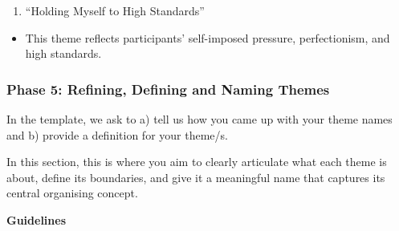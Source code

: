 \documentclass[
  english,
  letterpaper,
  DIV=11,
  numbers=noendperiod]{scrreprt}
\providecommand{\tightlist}{%
  \setlength{\itemsep}{0pt}\setlength{\parskip}{0pt}}
\begin{document}
\begin{tcolorbox}
\begin{enumerate}
\def\labelenumi{\arabic{enumi}.}
\setcounter{enumi}{1}
\tightlist
\item
  ``Holding Myself to High Standards''
\end{enumerate}

\begin{itemize}
\tightlist
\item
  This theme reflects participants' self-imposed pressure,
  perfectionism, and high standards.
\end{itemize}

\end{tcolorbox}

\subsubsection{Phase 5: Refining, Defining and Naming
Themes}\label{phase-5-refining-defining-and-naming-themes}

\begin{tcolorbox}[enhanced jigsaw, breakable, bottomtitle=1mm, leftrule=.75mm, opacityback=0, colbacktitle=quarto-callout-important-color!10!white, opacitybacktitle=0.6, toprule=.15mm, colback=white, left=2mm, coltitle=black, bottomrule=.15mm, titlerule=0mm, title=\textcolor{quarto-callout-important-color}{\faExclamation}\hspace{0.5em}{Phase 5: What is asked for?}, toptitle=1mm, colframe=quarto-callout-important-color-frame, arc=.35mm, rightrule=.15mm]

In the template, we ask to a) tell us how you came up with your theme
names and b) provide a definition for your theme/s.

\end{tcolorbox}

In this section, this is where you aim to clearly articulate what each
theme is about, define its boundaries, and give it a meaningful name
that captures its central organising concept.

\textbf{Guidelines}
\end{document}

